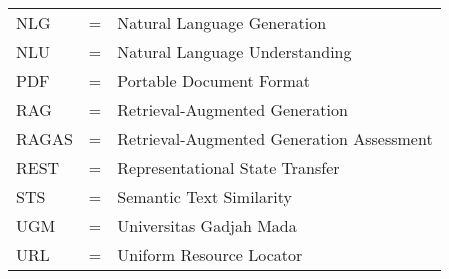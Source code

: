 \begin{tabular}{llp{3in}}
	NLG     & \hspace{1.5cm} = & Natural Language Generation                                  \\
	NLU     & \hspace{1.5cm} = & Natural Language Understanding                               \\
	PDF     & \hspace{1.5cm} = & Portable Document Format                                     \\
	RAG     & \hspace{1.5cm} = & Retrieval-Augmented Generation                               \\
	RAGAS   & \hspace{1.5cm} = & Retrieval-Augmented Generation Assessment                    \\
	REST    & \hspace{1.5cm} = & Representational State Transfer                              \\
	STS     & \hspace{1.5cm} = & Semantic Text Similarity                                     \\
	UGM     & \hspace{1.5cm} = & Universitas Gadjah Mada                                      \\
	URL     & \hspace{1.5cm} = & Uniform Resource Locator                                     \\
\end{tabular}
